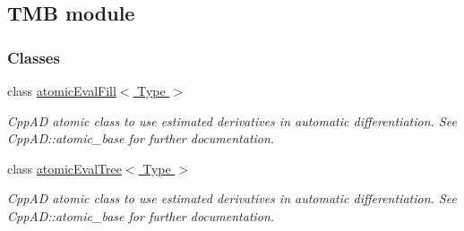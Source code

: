 \hypertarget{group__tmb}{}\subsection{T\+M\+B module}
\label{group__tmb}
\subsubsection*{Classes}
\begin{DoxyCompactItemize}
\item 
class \hyperlink{classatomicEvalFill}{atomic\+Eval\+Fill$<$ Type $>$}
\begin{DoxyCompactList}\small\item\em Cpp\+A\+D atomic class to use estimated derivatives in automatic differentiation. See Cpp\+A\+D\+::atomic\+\_\+base for further documentation. \end{DoxyCompactList}\item 
class \hyperlink{classatomicEvalTree}{atomic\+Eval\+Tree$<$ Type $>$}
\begin{DoxyCompactList}\small\item\em Cpp\+A\+D atomic class to use estimated derivatives in automatic differentiation. See Cpp\+A\+D\+::atomic\+\_\+base for further documentation. \end{DoxyCompactList}\end{DoxyCompactItemize}
